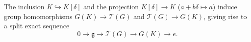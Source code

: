 The inclusion $K \hookrightarrow K[\delta]$ and the projection $K[\delta] \to K$ ($a + b\delta \mapsto a$) induce group homomorphisms $G(K) \to \mathcal{T}(G)$ and $\mathcal{T}(G) \to G(K)$, giving rise to a split exact sequence $$0 \to \mathfrak{g} \to \mathcal{T}(G) \to G(K) \to e.$$
